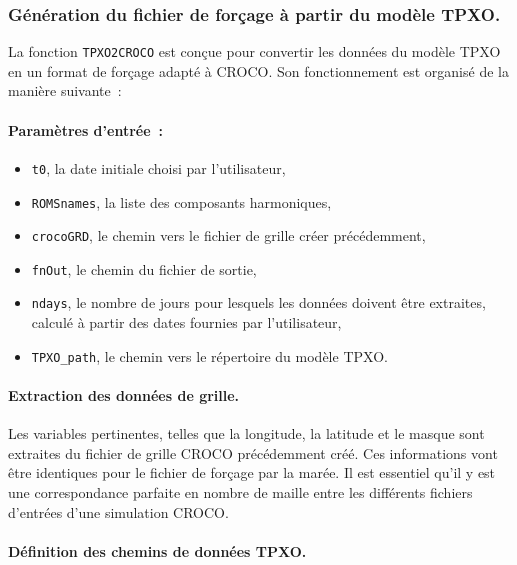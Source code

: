 \subsubsection{Génération du fichier de forçage à partir du modèle TPXO.}

La fonction \texttt{TPXO2CROCO} est conçue pour convertir les données du modèle TPXO en un format de forçage adapté à CROCO. Son fonctionnement est organisé de la manière suivante~:

\paragraph{Paramètres d'entrée~:\\}

\begin{itemize}
	\item \texttt{t0}, la date initiale choisi par l'utilisateur,
	\item \texttt{ROMSnames}, la liste des composants harmoniques,
	\item \texttt{crocoGRD}, le chemin vers le fichier de grille créer précédemment,
	\item \texttt{fnOut}, le chemin du fichier de sortie,
	\item \texttt{ndays}, le nombre de jours pour lesquels les données doivent être extraites, calculé à partir des dates fournies par l'utilisateur,
	\item \texttt{TPXO\_path}, le chemin vers le répertoire du modèle TPXO.
\end{itemize}

\paragraph{Extraction des données de grille.\\}

Les variables pertinentes, telles que la longitude, la latitude et le masque sont extraites du fichier de grille CROCO précédemment créé. Ces informations vont être identiques pour le fichier de forçage par la marée. Il est essentiel qu'il y est une correspondance parfaite en nombre de maille entre les différents fichiers d'entrées d'une simulation CROCO.

\paragraph{Définition des chemins de données TPXO.\\}

